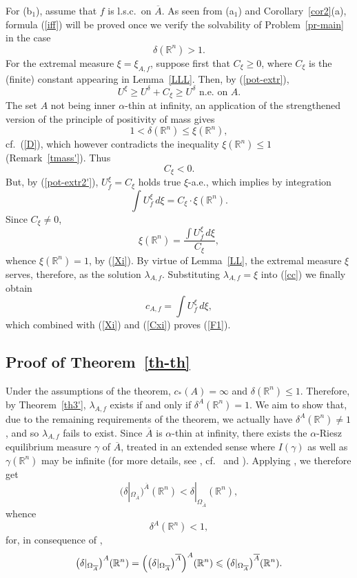 \documentclass[12pt,a4paper,reqno]{amsart} %
\theoremstyle{lause}
\theoremstyle{maaritelma}
\theoremstyle{lause}
\theoremstyle{maaritelma}
\numberwithin{equation}{section}
\begin{document}
For (b$_1$), assume that $f$ is l.s.c.\ on $\overline{A}$. As seen from (a$_1$) and Corollary~\ref{cor2}(a), formula (\ref{iff}) will be proved once we verify the solvability of Problem~\ref{pr-main} in the case
\begin{equation}\label{D}
\delta(\mathbb R^n)>1.
\end{equation}
For the extremal measure $\xi=\xi_{A,f}$, suppose first that $C_\xi\geqslant0$, where $C_\xi$ is the (finite) constant appearing in Lemma~\ref{LLL}. Then, by (\ref{pot-extr}),
\[U^\xi\geqslant U^\delta+C_\xi\geqslant U^\delta\text{ \ n.e.\ on $A$.}\]
The set $A$ not being inner $\alpha$-thin at infinity, an application of the strengthened version of the principle of positivity of mass \cite[Theorem~1.2]{Z-Deny} gives
\[1<\delta(\mathbb R^n)\leqslant\xi(\mathbb R^n),\]
cf.\ (\ref{D}), which however contradicts the inequality $\xi(\mathbb R^n)\leqslant1$ (Remark~\ref{tmass'}). Thus
\begin{equation}\label{Cxi}
C_\xi<0.
\end{equation}
But, by (\ref{pot-extr2'}), $U^\xi_f=C_\xi$ holds true $\xi$-a.e., which implies by integration
\begin{equation*}\label{comb}
\int U^\xi_f\,d\xi=C_\xi\cdot\xi(\mathbb R^n).
\end{equation*}
Since $C_\xi\ne0$,
\[\xi(\mathbb R^n)=\frac{\int U^\xi_f\,d\xi}{C_\xi},\]
whence $\xi(\mathbb R^n)=1$, by (\ref{Xi}). By virtue of Lemma~\ref{LL}, the extremal measure $\xi$ serves, therefore, as the solution $\lambda_{A,f}$. Substituting $\lambda_{A,f}=\xi$ into (\ref{cc}) we finally obtain
\[c_{A,f}=\int U^\xi_f\,d\xi,\]
which combined with (\ref{Xi}) and (\ref{Cxi}) proves (\ref{F1}).

\subsection{Proof of Theorem~\ref{th-th}}\label{sec-pr7} Under the assumptions of the theorem, $c_*(A)=\infty$ and $\delta(\mathbb R^n)\leqslant1$. Therefore, by Theorem~\ref{th3'}, $\lambda_{A,f}$ exists if and only if $\delta^A(\mathbb R^n)=1$.
We aim to show that, due to the remaining requirements of the theorem, we actually have
$\delta^A(\mathbb R^n)\ne1$, and so $\lambda_{A,f}$ fails to exist.
Since $\overline{A}$ is $\alpha$-thin at infinity, there exists the $\alpha$-Riesz equilibrium measure $\gamma$ of $\overline{A}$, treated in an extended sense where $I(\gamma)$ as well as $\gamma(\mathbb R^n)$ may be infinite (for more details, see \cite[Section~V.1.1]{L}, cf.\ \cite[Section~5]{Z-bal} and \cite[Sections~1.3, 2.1]{Z-bal2}). Applying \cite[Theorem~8.7]{Z-bal}, we therefore get
\[\bigl(\delta|_{\Omega_{\overline{A}}}\bigr)^{\overline{A}}(\mathbb R^n)<\delta|_{\Omega_{\overline{A}}}(\mathbb R^n),\]
whence
\[\delta^A(\mathbb R^n)<1,\] for, in consequence of \cite[Corollaries~4.2, 4.9]{Z-bal},
\[\bigl(\delta|_{\Omega_{\overline{A}}}\bigr)^A(\mathbb R^n)=\Bigl(\bigl(\delta|_{\Omega_{\overline{A}}}\bigr)^{\overline{A}}\Bigr)^A(\mathbb R^n)\leqslant\bigl(\delta|_{\Omega_{\overline{A}}}\bigr)^{\overline{A}}(\mathbb R^n).\]
\end{document}
